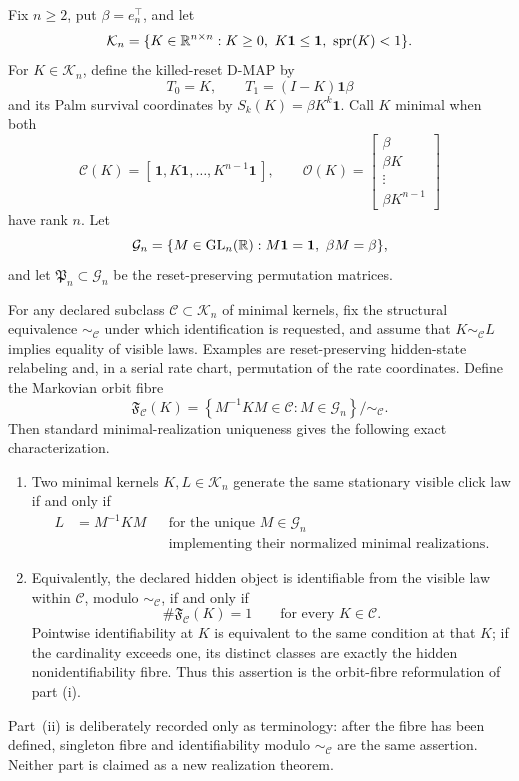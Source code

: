 \begin{proposition}
\label{thm:nstate-killed-reset-identifiability-dichotomy-main}
Fix \(n\ge2\), put \(\beta=e_n^\top\), and let
\[
\mathcal K_n=\{K\in\mathbb{R}^{n\times n}:K\ge0,\ K\mathbf1\le\mathbf1,\
\operatorname{spr}(K)<1\}.
\]
For \(K\in\mathcal K_n\), define the killed-reset D-MAP by
\[
T_0=K,\qquad T_1=(I-K)\mathbf1\beta
\]
and its Palm survival coordinates by \(S_k(K)=\beta K^k\mathbf1\).
Call \(K\) minimal when both
\[
\mathcal C(K)=[\,\mathbf1,K\mathbf1,\ldots,K^{n-1}\mathbf1\,],
\qquad
\mathcal O(K)=
\begin{bmatrix}\beta\\ \beta K\\ \vdots\\ \beta K^{n-1}\end{bmatrix}
\]
have rank \(n\). Let
\[
\mathcal G_n=\{M\in\operatorname{GL}_n(\mathbb{R}):
M\mathbf1=\mathbf1,\ \beta M=\beta\},
\]
and let \(\mathfrak P_n\subset\mathcal G_n\) be the reset-preserving
permutation matrices.

For any declared subclass \(\mathcal C\subset\mathcal K_n\) of minimal
kernels, fix the structural equivalence \(\sim_{\mathcal C}\) under which
identification is requested, and assume that \(K\sim_{\mathcal C}L\) implies
equality of visible laws. Examples are reset-preserving hidden-state
relabeling and, in a serial rate chart, permutation of the rate coordinates.
Define the Markovian orbit fibre
\[
\mathfrak F_{\mathcal C}(K)=
\left\{M^{-1}KM\in\mathcal C:M\in\mathcal G_n\right\}
\big/\!\sim_{\mathcal C}.
\]
Then standard minimal-realization uniqueness gives the following exact
characterization.
\begin{enumerate}[label=\textup{(\roman*)}]
\item Two minimal kernels \(K,L\in\mathcal K_n\) generate the same stationary
visible click law if and only if
\[
\begin{aligned}
L&=M^{-1}KM &&\text{for the unique }M\in\mathcal G_n\\
&&&\text{implementing their normalized minimal realizations}.
\end{aligned}
\]
\item Equivalently, the declared hidden object is identifiable from the visible law within
\(\mathcal C\), modulo \(\sim_{\mathcal C}\), if and only if
\[
\#\mathfrak F_{\mathcal C}(K)=1\qquad\text{for every }K\in\mathcal C.
\]
Pointwise identifiability at \(K\) is equivalent to the same condition at
that \(K\); if the cardinality exceeds one, its distinct classes are exactly
the hidden nonidentifiability fibre. Thus this assertion is the orbit-fibre
reformulation of part \textup{(i)}.
\end{enumerate}
Part~\textup{(ii)} is deliberately recorded only as terminology: after the
fibre has been defined, singleton fibre and identifiability modulo
\(\sim_{\mathcal C}\) are the same assertion.  Neither part is claimed as a
new realization theorem.
\end{proposition}

